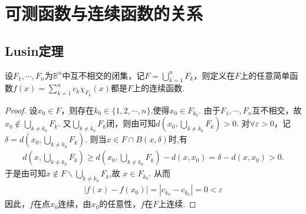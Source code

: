 \documentclass[../../main.tex]{subfiles}
\begin{document}
\section{可测函数与连续函数的关系}

\subsection{Lusin定理}

\begin{lemma}\label{lemma:简单函数在无交闭集连续则在这些闭集的并上也连续}
设\(F_1, \cdots, F_n\)为\(\mathbb{R}^n\)中互不相交的闭集，记\(F = \bigcup_{k = 1}^{n} F_k\)，则定义在$F$上的任意简单函数\(f(x) = \sum_{k = 1}^{n} c_k \chi_{F_k}(x)\)都是\(F\)上的连续函数.
\end{lemma}
\begin{proof}
设\(x_0 \in F\)，则存在\(k_0\in \{1,2,\cdots,n\}\),使得\(x_0 \in F_{k_0}\). 由于\(F_1, \cdots, F_n\)互不相交，故\(x_0 \notin \bigcup_{k \neq k_0} F_k\). 又\(\bigcup_{k \neq k_0} F_k\)闭，则由可知\(d(x_0, \bigcup_{k \neq k_0} F_k) > 0\). 对\(\forall \varepsilon > 0\)，记\(\delta = d(x_0, \bigcup_{k \neq k_0} F_k)\). 则当\(x \in F\cap B(x,\delta)\)时,有
\begin{align*}
d\left( x,\bigcup_{k\ne k_0}{F_k} \right) \geqslant d\left( x_0,\bigcup_{k\ne k_0}{F_k} \right) -d\left( x,x_0 \right) =\delta -d\left( x,x_0 \right) >0.
\end{align*}
于是由可知$x\notin F\backslash \bigcup_{k\ne k_0}{F_k}$,故
\(x \in F_{k_0}\). 从而
\begin{align*}
|f(x) - f(x_0)| = |c_{k_0} - c_{k_0}| = 0 < \varepsilon
\end{align*}
因此，\(f\)在点\(x_0\)连续，由\(x_0\)的任意性，\(f\)在\(F\)上连续. 
\end{proof}
\end{document}
